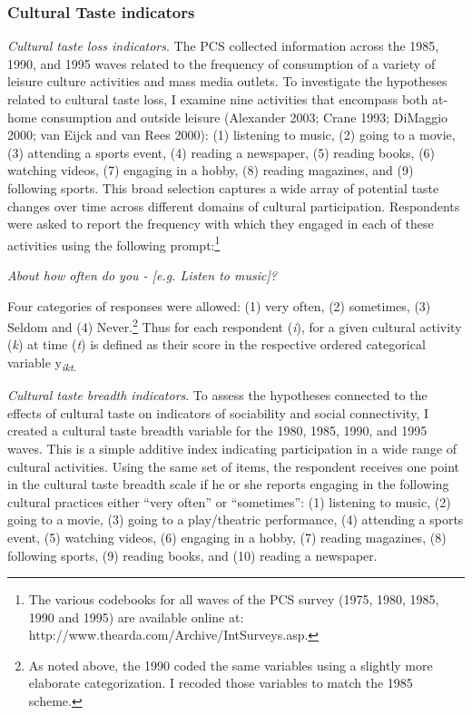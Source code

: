 \documentclass[
]{article}
\begin{document}
\subsubsection{Cultural Taste indicators}\label{cultural-taste-indicators}

\emph{Cultural taste loss indicators}. The PCS collected information across the 1985, 1990, and 1995 waves related to the frequency of consumption of a variety of leisure culture activities and mass media outlets. To investigate the hypotheses related to cultural taste loss, I examine nine activities that encompass both at-home consumption and outside leisure (Alexander 2003; Crane 1993; DiMaggio 2000; van Eijck and van Rees 2000): (1) listening to music, (2) going to a movie, (3) attending a sports event, (4) reading a newspaper, (5) reading books, (6) watching videos, (7) engaging in a hobby, (8) reading magazines, and (9) following sports. This broad selection captures a wide array of potential taste changes over time across different domains of cultural participation. Respondents were asked to report the frequency with which they engaged in each of these activities using the following prompt:\footnote{The various codebooks for all waves of the PCS survey (1975, 1980, 1985, 1990 and 1995) are available online at: http://www.thearda.com/Archive/IntSurveys.asp.}

\emph{About how often do you - [e.g. Listen to music]?}

Four categories of responses were allowed: (1) very often, (2) sometimes, (3) Seldom and (4) Never.\footnote{As noted above, the 1990 coded the same variables using a slightly more elaborate categorization. I recoded those variables to match the 1985 scheme.} Thus for each respondent (\emph{i}), for a given cultural activity (\emph{k}) at time (\emph{t}) is defined as their score in the respective ordered categorical variable y\textsubscript{\emph{ikt}.}

\emph{Cultural taste breadth indicators}. To assess the hypotheses connected to the effects of cultural taste on indicators of sociability and social connectivity, I created a cultural taste breadth variable for the 1980, 1985, 1990, and 1995 waves. This is a simple additive index indicating participation in a wide range of cultural activities. Using the same set of items, the respondent receives one point in the cultural taste breadth scale if he or she reports engaging in the following cultural practices either ``very often'' or ``sometimes'': (1) listening to music, (2) going to a movie, (3) going to a play/theatric performance, (4) attending a sports event, (5) watching videos, (6) engaging in a hobby, (7) reading magazines, (8) following sports, (9) reading books, and (10) reading a newspaper.
\end{document}
